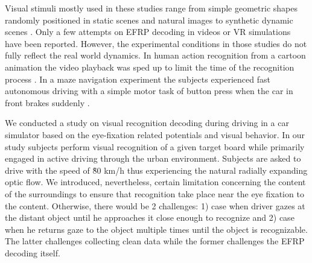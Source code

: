 \documentclass[12pt]{iopart}
\begin{document}
Visual stimuli mostly used in these studies range from simple geometric shapes
randomly positioned in static scenes and natural images to synthetic dynamic
scenes \cite{uscumlic_active_2016,devillez_p300_2015}. 
Only a few attempts on EFRP decoding in videos or VR simulations
have been reported. 
However, the experimental conditions in those studies do not fully
reflect the real world dynamics.
In human action recognition from a cartoon animation the video playback was sped up
to limit the time of the recognition process \cite{rosenthal_evoked_2014}.
In a maze navigation experiment the subjects experienced fast autonomous driving
with a simple motor task of button press when the car in front brakes suddenly \cite{jangraw_neurally_2014}.


We conducted a study on visual recognition decoding during driving
in a car simulator based on the eye-fixation related
potentials and visual behavior. 
In our study subjects perform visual recognition of a given
target board while primarily engaged in active driving through
the urban environment. Subjects are asked to drive with the speed
of \~80 km/h thus experiencing the natural radially
expanding optic flow. 
We introduced, nevertheless, certain limitation concerning 
the content of the surroundings to ensure that recognition
take place near the eye fixation to the content. 
Otherwise, there would be 2 challenges: 
1) case when driver gazes at the distant object
until he approaches it close enough to recognize and
2) case when he returns gaze to the object multiple times until the object
is recognizable.
The latter challenges collecting clean data while the former challenges
the EFRP decoding itself.


\end{document}
